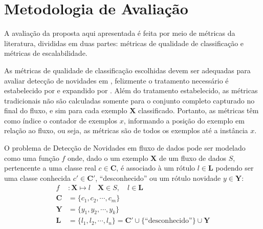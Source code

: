 \section{Metodologia de Avaliação}\label{sec:esperados}


A avaliação da proposta aqui apresentada é feita por meio de métricas da
literatura, divididas em duas partes: métricas de qualidade de classificação
e métricas de escalabilidade.

As métricas de qualidade de classificação escolhidas devem ser adequadas para
avaliar detecção de novidades em \streams, felizmente o tratamento necessário é
estabelecido por  e expandido por
.
Além do tratamento estabelecido, as métricas tradicionais não são calculadas
somente para o conjunto completo capturado no final do fluxo, e sim para cada
exemplo $\mathbf{X}$ classificado.
Portanto, as métricas têm como índice o contador de exemplos $x$, informando a
posição do exemplo em relação ao fluxo, ou seja, as métricas são de todos os
exemplos até a instância $x$.

\begin{definition}
  O problema de Detecção de Novidades em fluxo de dados pode ser modelado como
  uma função $f$ onde, dado o um exemplo $\mathbf{X}$ de um fluxo de dados $S$,
  pertencente a uma classe real $c \in \mathbf{C}$, é associado à um rótulo $l
  \in \mathbf{L}$ podendo ser uma classe conhecida $c' \in \mathbf{C}'$, ``desconhecido''
  ou um rótulo novidade $y \in \mathbf{Y}$:
  \begin{align}
    f  &: \mathbf{X} \mapsto l  \quad \mathbf{X} \in S , \quad l \in \mathbf{L}\\
    \mathbf{C} &= \{ c_1, c_2, \cdots, c_m \}  \label{eq:classes} \\
    \mathbf{Y} &= \{ y_1, y_2, \cdots, y_k \}  \label{eq:novelies} \\
    \mathbf{L} &= \{ l_1, l_2, \cdots, l_n \} = \mathbf{C}' \cup \{ \text{``desconhecido''} \} \cup \mathbf{Y} \label{eq:labels} 
  \end{align}
\end{definition}

